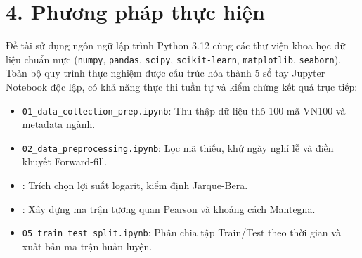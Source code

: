 \documentclass[12pt,a4paper,oneside,openany]{report}
\begin{document}
\section*{4. Phương pháp thực hiện}
Đề tài sử dụng ngôn ngữ lập trình Python 3.12 cùng các thư viện khoa học dữ liệu chuẩn mực (\texttt{numpy}, \texttt{pandas}, \texttt{scipy}, \texttt{scikit-learn}, \texttt{matplotlib}, \texttt{seaborn}). Toàn bộ quy trình thực nghiệm được cấu trúc hóa thành 5 sổ tay Jupyter Notebook độc lập, có khả năng thực thi tuần tự và kiểm chứng kết quả trực tiếp:
\begin{itemize}
  \item \texttt{01\_data\_collection\_prep.ipynb}: Thu thập dữ liệu thô 100 mã VN100 và metadata ngành.
  \item \texttt{02\_data\_preprocessing.ipynb}: Lọc mã thiếu, khử ngày nghỉ lễ và điền khuyết Forward-fill.
  \item {}: Trích chọn lợi suất logarit, kiểm định Jarque-Bera.
  \item {}: Xây dựng ma trận tương quan Pearson và khoảng cách Mantegna.
  \item \texttt{05\_train\_test\_split.ipynb}: Phân chia tập Train/Test theo thời gian và xuất bản ma trận huấn luyện.
\end{itemize}
\end{document}
